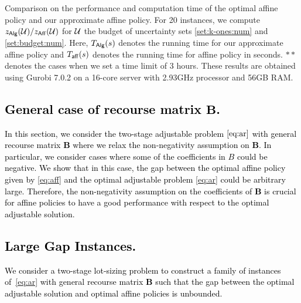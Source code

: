 \documentclass[moor]{informs1}              %
\newcommand{\mb}[1]{\ensuremath{\boldsymbol{#1}}}
\newcommand*{\red}{\textcolor{black}}
\begin{document}
\begin{table}[htp]
\begin{subtable}{.5\linewidth}
\end{subtable}
\caption{Comparison on the performance and computation time of the optimal affine policy and our approximate affine policy. For 20 instances, we compute $ z_{\sf{Alg}} ({\cal U})  / z_{\sf{Aff}}  ({\cal U})       $ for $\cal U$ the  budget of uncertainty sets \eqref{set:k-ones:num} and \eqref{set:budget:num}. Here, $T_{\sf Alg}(s)$ denotes the running time for our approximate affine policy and $T_{\sf aff}(s)$ denotes the running time for affine policy in seconds. $**$ denotes the cases when we set a time limit of 3 hours. These results are obtained using Gurobi 7.0.2 on a 16-core server with 2.93GHz processor and 56GB RAM.}
\label{tab:num}
\end{table}

\red{
\section{General case of recourse matrix $\mb B$.} \label{section:general B}
In this section, we consider the two-stage adjustable problem $\eqref{eq:ar}$ with general recourse matrix $\mb B$ where we relax the non-negativity assumption on $\mb B$. In particular, we consider cases where some of the coefficients in $B$ could be negative. %
We show that in this case, the gap between the optimal affine policy given by \eqref{eq:aff} and the optimal adjustable problem \eqref{eq:ar} could be arbitrary large. Therefore, the non-negativity assumption on the coefficients of $\mb B $ is crucial for affine policies to have a good performance with respect to the optimal adjustable solution. %
\subsection{Large Gap Instances.}
We consider a two-stage lot-sizing problem to construct a family of instances of~\eqref{eq:ar} with general recourse matrix $\mb B$ such that the gap between the optimal adjustable solution and optimal affine policies is unbounded.}


\vspace{2mm}
\end{document}
